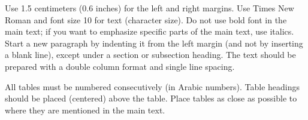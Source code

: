 \documentclass[a4paper, times, 10pt,twocolumn]{article}
\begin{document}

Use 1.5 centimeters (0.6 inches) for the left and right margins. Use Times New Roman and font size 10 for text (character size). Do not use bold font in the main text; if you want to emphasize specific parts of the main text, use italics. Start a new paragraph by indenting it from the left margin (and not by inserting a blank line), except under a section or subsection heading. The text should be prepared with a double column format and single line spacing.


All tables must be numbered consecutively (in Arabic numbers). Table headings should be placed (centered) above the table. Place tables as close as possible to where they are mentioned in the main text. 
\end{document}
